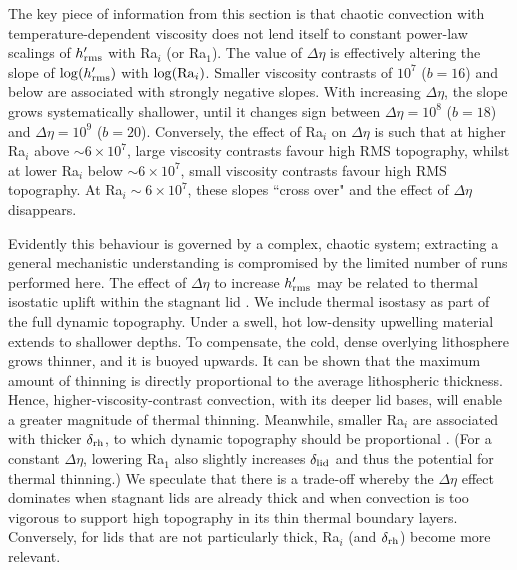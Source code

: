 \documentclass[trackchanges]{aastex63}
\newcommand{\todo}[1]{\textit{\textcolor{violet}{{#1}}}}
\begin{document}
The key piece of information from this section is that chaotic convection with temperature-dependent viscosity does not lend itself to constant power-law scalings of $h_{\rm rms}^\prime$ with Ra$_i$ (or Ra$_1$). The value of $\Delta \eta$ is effectively altering the slope of $\log(h_{\rm rms}^\prime)$ with $\log({\rm Ra}_i)$. Smaller viscosity contrasts of $10^7$ ($b=16$) and below are associated with strongly negative slopes. With increasing $\Delta \eta$, the slope grows systematically shallower, until it changes sign between $\Delta \eta = 10^8$ ($b=18$) and $\Delta \eta = 10^9$ ($b=20$). %
Conversely, the effect of Ra$_i$ on $\Delta \eta$ is such that at higher Ra$_i$ above $\sim 6 \times 10^7$, large viscosity contrasts favour high RMS topography, whilst at lower Ra$_i$ below $\sim 6 \times 10^7$, small viscosity contrasts favour high RMS topography. At Ra$_i \sim 6 \times 10^7$, these slopes ``cross over" and the effect of $\Delta \eta$ disappears. 

Evidently this behaviour is governed by a complex, chaotic system; extracting a general mechanistic understanding is compromised by the limited number of runs performed here. The effect of $\Delta \eta$ to increase $h_{\rm rms}^\prime$ may be related to thermal isostatic uplift within the stagnant lid \citep{kucinskas_isostatic_1994, moore_lithospheric_1995, orth_isostatic_2011}. We  include thermal isostasy as part of the full dynamic topography. Under a swell, hot low-density upwelling material extends to shallower depths. To compensate, the cold, dense overlying lithosphere grows thinner, and it is buoyed upwards. It can be shown that the maximum amount of thinning is directly proportional to the average lithospheric thickness. Hence, higher-viscosity-contrast convection, with its deeper lid bases, will enable a greater magnitude of thermal thinning. Meanwhile, smaller Ra$_i$ are associated with thicker $\delta_{\rm rh}$, to which dynamic topography should be proportional \citep{parsons_relationship_1983}. (For a constant $\Delta \eta$, lowering Ra$_1$ also slightly increases $\delta_{\rm lid}$ and thus the potential for thermal thinning.) We speculate that there is a trade-off whereby the $\Delta \eta$ effect dominates when stagnant lids are already thick and when convection is too vigorous to support high topography in its thin thermal boundary layers. Conversely, for lids that are not particularly thick, Ra$_i$ (and $\delta_{\rm rh}$) become more relevant.
\end{document}
